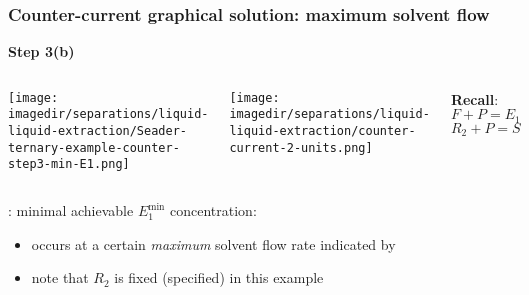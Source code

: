 \begin{frame}\frametitle{Counter-current graphical solution: maximum solvent flow}
	\textbf{Step 3(b)}
	\begin{columns}[t]
			\begin{center}
				\texttt{[image: \\imagedir/separations/liquid-liquid-extraction/Seader-ternary-example-counter-step3-min-E1.png]}
			\end{center}
			\begin{center}
				\texttt{[image: \\imagedir/separations/liquid-liquid-extraction/counter-current-2-units.png]}
			\end{center}
			\textbf{Recall}: 
			\vspace{-10pt}
			\[	F + P = E_1 \]
			\[	R_2 + P = S \]
	\end{columns}
	{\color{myOrange}{Subtle point}}: minimal achievable $E^\text{min}_1$ concentration: 
	{\small
		\begin{itemize}
			\item	occurs at a certain \emph{maximum} solvent flow rate indicated by {\LARGE{\color{myRed}{$\mathbf{\circ}$}}}
			\vspace{-6pt}	
			\item	note that $R_2$ is fixed (specified) in this example
		\end{itemize}
	}
\end{frame}

